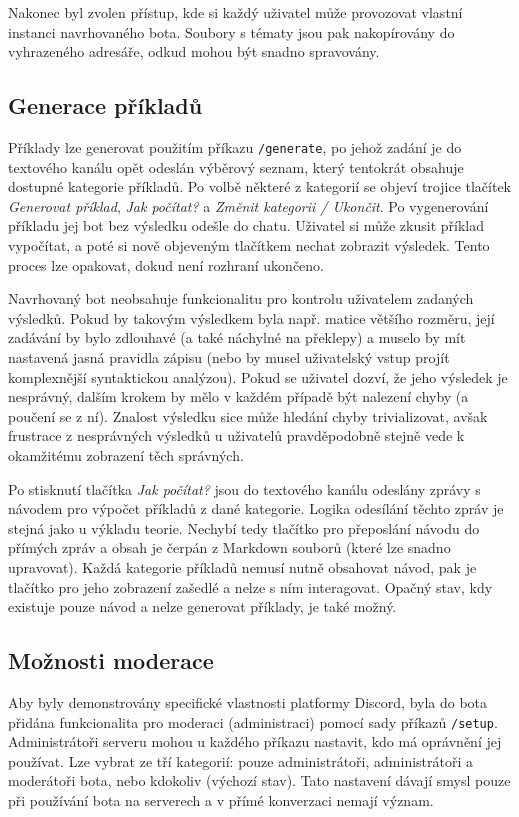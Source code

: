 \documentclass[FM]{tulthesis}
\begin{document}
	Nakonec byl zvolen přístup, kde si každý uživatel může provozovat vlastní instanci navrhovaného bota. Soubory s tématy jsou pak nakopírovány do vyhrazeného adresáře, odkud mohou být snadno spravovány.
	
	\subsection{Generace příkladů} %
	
	Příklady lze generovat použitím příkazu \verb*|/generate|, po jehož zadání je do textového kanálu opět odeslán výběrový seznam, který tentokrát obsahuje dostupné kategorie příkladů. Po volbě některé z kategorií se objeví trojice tlačítek \textit{Generovat příklad}, \textit{Jak počítat?} a \textit{Změnit kategorii / Ukončit}. Po vygenerování příkladu jej bot bez výsledku odešle do chatu. Uživatel si může zkusit příklad vypočítat, a poté si nově objeveným tlačítkem nechat zobrazit výsledek. Tento proces lze opakovat, dokud není rozhraní ukončeno.
	
	Navrhovaný bot neobsahuje funkcionalitu pro kontrolu uživatelem zadaných výsledků. Pokud by takovým výsledkem byla např. matice většího rozměru, její zadávání by bylo zdlouhavé (a také náchylné na překlepy) a muselo by mít nastavená jasná pravidla zápisu (nebo by musel uživatelský vstup projít komplexnější syntaktickou analýzou). Pokud se uživatel dozví, že jeho výsledek je nesprávný, dalším krokem by mělo v každém případě být nalezení chyby (a poučení se z ní). Znalost výsledku sice může hledání chyby trivializovat, avšak frustrace z nesprávných výsledků u uživatelů pravděpodobně stejně vede k okamžitému zobrazení těch správných.
	
	Po stisknutí tlačítka \textit{Jak počítat?} jsou do textového kanálu odeslány zprávy s návodem pro výpočet příkladů z dané kategorie. Logika odesílání těchto zpráv je stejná jako u výkladu teorie. Nechybí tedy tlačítko pro přeposlání návodu do přímých zpráv a obsah je čerpán z Markdown souborů (které lze snadno upravovat). Každá kategorie příkladů nemusí nutně obsahovat návod, pak je tlačítko pro jeho zobrazení zašedlé a nelze s ním interagovat. Opačný stav, kdy existuje pouze návod a nelze generovat příklady, je také možný.
		
	\subsection{Možnosti moderace}
	
	Aby byly demonstrovány specifické vlastnosti platformy Discord, byla do bota přidána funkcionalita pro moderaci (administraci) pomocí sady příkazů \verb*|/setup|. Administrátoři serveru mohou u každého příkazu nastavit, kdo má oprávnění jej používat. Lze vybrat ze tří kategorií: pouze administrátoři, administrátoři a moderátoři bota, nebo kdokoliv (výchozí stav). Tato nastavení dávají smysl pouze při používání bota na serverech a v přímé konverzaci nemají význam.
	
\end{document}
